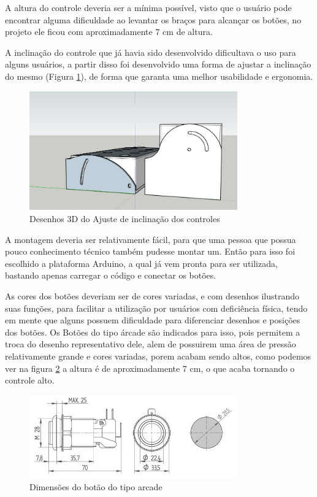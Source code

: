 \documentclass[
	12pt,			%
	openright,		%
	oneside,			%
	a4paper,			%
	chapter=TITLE,		%
	english,			%
	brazil,			%
	]{abntex2}
\begin{document}
A altura do controle deveria ser a mínima possível, visto que o usuário pode encontrar alguma dificuldade ao levantar os braços para alcançar os botões, no projeto ele ficou com aproximadamente 7 cm de altura.
 
A inclinação do controle que já havia sido desenvolvido dificultava o uso para alguns usuários, a partir disso foi desenvolvido uma forma de ajustar a inclinação do mesmo (Figura \ref{img:img-18}), de forma que garanta uma melhor usabilidade e ergonomia.

\begin{figure}[H]
	\centering
		\includegraphics[width=0.8\textwidth]{./img/img-18.png}
		\caption{Desenhos 3D do Ajuste de inclinação dos controles}
		\label{img:img-18}
\end{figure}

A montagem deveria ser relativamente fácil, para que uma pessoa que possua pouco conhecimento técnico também pudesse montar um. Então para isso foi escolhido a plataforma Arduino, a qual já vem pronta para ser utilizada, bastando apenas carregar o código e conectar os botões.

As cores dos botões deveriam ser de cores variadas, e com desenhos ilustrando suas funções, para facilitar a utilização por usuários com deficiência física, tendo em mente que alguns possuem dificuldade para diferenciar desenhos e posições dos botões. Os Botões do tipo árcade são indicados para isso, pois permitem a troca do desenho representativo dele, alem de possuirem uma área de pressão relativamente grande e cores variadas, porem acabam sendo altos, como podemos ver na figura \ref{img:img-13} a altura é de aproximadamente 7 cm, o que acaba tornando o controle alto.

\begin{figure}[H]
	\centering
		\includegraphics[width=0.8\textwidth]{./img/img-13.jpg}
		\caption{Dimensões do botão do tipo arcade}
		\label{img:img-13}
\end{figure}
\end{document}
